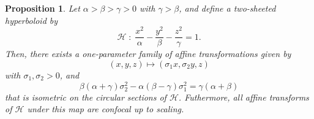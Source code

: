 \documentclass[10pt, a4paper]{article}
\theoremstyle{BoldTopSpacing}
\theoremstyle{BoldTopSpacing}
\theoremstyle{BoldTopSpacing}
\theoremstyle{BoldTopBottomSpacing}
\theoremstyle{BoldTopSpacing}
\newtheorem{proposition}{Proposition}[section]
\theoremstyle{BoldTopBottomSpacing}
\theoremstyle{remark}
\begin{document}
\begin{proposition}
\label{prop:affine-transformation-two-hyperboloid}
Let $\alpha > \beta > \gamma > 0$ with $\gamma > \beta$, and define a two-sheeted hyperboloid by
\[
    \mathcal{H} \; : \; \frac{x^2}{\alpha} - \frac{y^2}{\beta} - \frac{z^2}{\gamma} = 1.
\]
Then, there exists a one-parameter family of affine transformations given by
\[
    (x, y, z) \mapsto (\sigma_{1}x, \sigma_{2}y, z)
\]
with $\sigma_{1}, \sigma_{2} > 0$, and
\begin{equation}
\label{eq:sigmas-h2}
    \beta (\alpha + \gamma) \sigma_{2}^2 - \alpha (\beta - \gamma) \sigma_{1}^2 = \gamma (\alpha + \beta)
\end{equation}
that is isometric on the circular sections of $\mathcal{H}$. Futhermore, all affine transforms of $\mathcal{H}$ under this map are confocal up to scaling.
\end{proposition}
\end{document}

